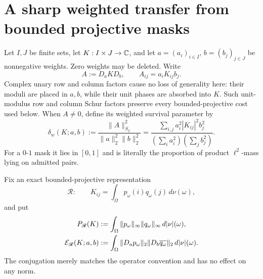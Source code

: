 \section{A sharp weighted transfer from bounded projective masks}
\label{sec:tpc49-weighted-transfer}

Let \(I,J\) be finite sets, let \(K:I\times J\to\mathbb C\), and let
\(a=(a_i)_{i\in I}\), \(b=(b_j)_{j\in J}\) be nonnegative weights.
Zero weights may be deleted.  Write
\begin{equation}
 A:=D_aKD_b,
 \qquad A_{ij}=a_iK_{ij}b_j.
 \label{eq:tpc49-weighted-matrix}
\end{equation}
Complex unary row and column factors cause no loss of generality here:
their moduli are placed in \(a,b\), while their unit phases are absorbed
into \(K\).  Such unit-modulus row and column Schur factors preserve every
bounded-projective cost used below.
When \(A\ne0\), define its weighted survival parameter by
\begin{equation}
 \delta_w(K;a,b)
 :=\frac{\|A\|_{S_2}^2}{\|a\|_2^2\|b\|_2^2}
 =\frac{\sum_{i,j}a_i^2|K_{ij}|^2b_j^2}
 {\left(\sum_i a_i^2\right)\left(\sum_jb_j^2\right)}.
 \label{eq:tpc49-weighted-admission}
\end{equation}
For a \(0\)-\(1\) mask it lies in \([0,1]\) and is literally the
proportion of product \(\ell^2\)-mass lying on admitted pairs.

Fix an exact bounded-projective representation
\begin{equation}
 \mathscr R:\qquad
 K_{ij}=\int_\Omega p_\omega(i)q_\omega(j)\,d\nu(\omega),
 \label{eq:tpc49-bounded-representation}
\end{equation}
and put
\begin{align}
 P_{\mathscr R}(K)
 &:=\int_\Omega\|p_\omega\|_\infty
       \|q_\omega\|_\infty\,d|\nu|(\omega),
 \label{eq:tpc49-fixed-bounded-cost}\\
 \mathcal E_{\mathscr R}(K;a,b)
 &:=\int_\Omega
 \|D_ap_\omega\|_2\|D_b\overline{q_\omega}\|_2
 \,d|\nu|(\omega).
 \label{eq:tpc49-weighted-Hilbert-envelope}
\end{align}
The conjugation merely matches the operator convention and has no
effect on any norm.

